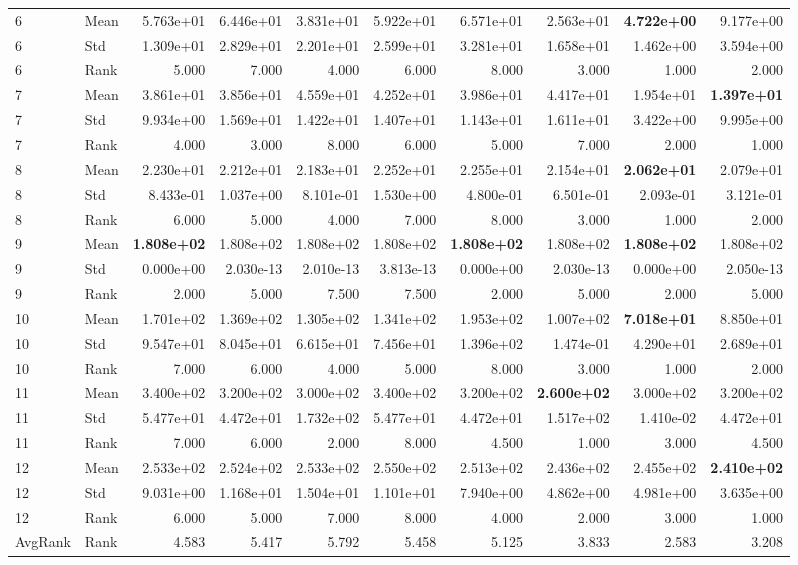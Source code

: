 \begin{table}[t]
\begin{tabular}{llrrrrrrrr}
6 & Mean & 5.763e+01 & 6.446e+01 & 3.831e+01 & 5.922e+01 & 6.571e+01 & 2.563e+01 & \textbf{4.722e+00} & 9.177e+00 \\
6 & Std & 1.309e+01 & 2.829e+01 & 2.201e+01 & 2.599e+01 & 3.281e+01 & 1.658e+01 & 1.462e+00 & 3.594e+00 \\
6 & Rank & 5.000 & 7.000 & 4.000 & 6.000 & 8.000 & 3.000 & 1.000 & 2.000 \\
7 & Mean & 3.861e+01 & 3.856e+01 & 4.559e+01 & 4.252e+01 & 3.986e+01 & 4.417e+01 & 1.954e+01 & \textbf{1.397e+01} \\
7 & Std & 9.934e+00 & 1.569e+01 & 1.422e+01 & 1.407e+01 & 1.143e+01 & 1.611e+01 & 3.422e+00 & 9.995e+00 \\
7 & Rank & 4.000 & 3.000 & 8.000 & 6.000 & 5.000 & 7.000 & 2.000 & 1.000 \\
8 & Mean & 2.230e+01 & 2.212e+01 & 2.183e+01 & 2.252e+01 & 2.255e+01 & 2.154e+01 & \textbf{2.062e+01} & 2.079e+01 \\
8 & Std & 8.433e-01 & 1.037e+00 & 8.101e-01 & 1.530e+00 & 4.800e-01 & 6.501e-01 & 2.093e-01 & 3.121e-01 \\
8 & Rank & 6.000 & 5.000 & 4.000 & 7.000 & 8.000 & 3.000 & 1.000 & 2.000 \\
9 & Mean & \textbf{1.808e+02} & 1.808e+02 & 1.808e+02 & 1.808e+02 & \textbf{1.808e+02} & 1.808e+02 & \textbf{1.808e+02} & 1.808e+02 \\
9 & Std & 0.000e+00 & 2.030e-13 & 2.010e-13 & 3.813e-13 & 0.000e+00 & 2.030e-13 & 0.000e+00 & 2.050e-13 \\
9 & Rank & 2.000 & 5.000 & 7.500 & 7.500 & 2.000 & 5.000 & 2.000 & 5.000 \\
10 & Mean & 1.701e+02 & 1.369e+02 & 1.305e+02 & 1.341e+02 & 1.953e+02 & 1.007e+02 & \textbf{7.018e+01} & 8.850e+01 \\
10 & Std & 9.547e+01 & 8.045e+01 & 6.615e+01 & 7.456e+01 & 1.396e+02 & 1.474e-01 & 4.290e+01 & 2.689e+01 \\
10 & Rank & 7.000 & 6.000 & 4.000 & 5.000 & 8.000 & 3.000 & 1.000 & 2.000 \\
11 & Mean & 3.400e+02 & 3.200e+02 & 3.000e+02 & 3.400e+02 & 3.200e+02 & \textbf{2.600e+02} & 3.000e+02 & 3.200e+02 \\
11 & Std & 5.477e+01 & 4.472e+01 & 1.732e+02 & 5.477e+01 & 4.472e+01 & 1.517e+02 & 1.410e-02 & 4.472e+01 \\
11 & Rank & 7.000 & 6.000 & 2.000 & 8.000 & 4.500 & 1.000 & 3.000 & 4.500 \\
12 & Mean & 2.533e+02 & 2.524e+02 & 2.533e+02 & 2.550e+02 & 2.513e+02 & 2.436e+02 & 2.455e+02 & \textbf{2.410e+02} \\
12 & Std & 9.031e+00 & 1.168e+01 & 1.504e+01 & 1.101e+01 & 7.940e+00 & 4.862e+00 & 4.981e+00 & 3.635e+00 \\
12 & Rank & 6.000 & 5.000 & 7.000 & 8.000 & 4.000 & 2.000 & 3.000 & 1.000 \\
AvgRank & Rank & 4.583 & 5.417 & 5.792 & 5.458 & 5.125 & 3.833 & 2.583 & 3.208 \\
\hline
\end{tabular}
\end{table}
